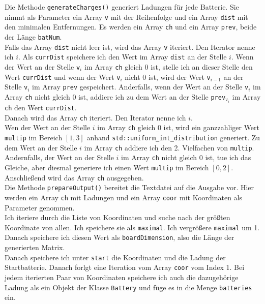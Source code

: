 \documentclass[a4paper,10pt,ngerman]{scrartcl}
\begin{document}
Die Methode \texttt{generateCharges()} generiert Ladungen für jede Batterie. Sie nimmt als Parameter ein
Array \texttt{v} mit der Reihenfolge und ein Array \texttt{dist} mit den minimalen Entfernungen.
Es werden ein Array \texttt{ch} und ein Array \texttt{prev}, beide der Länge \texttt{batNum}.\\
Falls das Array \texttt{dist} nicht leer ist, wird das Array \texttt{v} iteriert. Den Iterator nenne ich $i$.
Als \texttt{currDist} speichere ich den Wert im Array \texttt{dist} an der Stelle $i$.
Wenn der Wert an der Stelle \texttt{v}$_i$ im Array \texttt{ch} gleich 0 ist, stelle ich an dieser Stelle den Wert \texttt{currDist}
und wenn der Wert \texttt{v}$_i$ nicht 0 ist, wird der Wert \texttt{v}$_{i-1}$ an der Stelle \texttt{v}$_i$ im Array \texttt{prev}
gespeichert.
Anderfalls, wenn der Wert an der Stelle \texttt{v}$_i$ im Array \texttt{ch} nicht gleich 0 ist, addiere ich
zu dem Wert an der Stelle \texttt{prev}$_{\texttt{v}_i}$ im Array \texttt{ch} den Wert \texttt{currDist}.\\
Danach wird das Array \texttt{ch} iteriert. Den Iterator nenne ich $i$.\\
Wen der Wert an der Stelle $i$ im Array \texttt{ch} gleich 0 ist, wird ein ganzzahliger Wert \texttt{multip} im Bereich $[1,3]$ anhand 
\texttt{std::uniform\_int\_distribution} generiert. Zu dem Wert an der Stelle $i$ im Array \texttt{ch} addiere ich den 2. Vielfachen 
von \texttt{multip}.
Andernfalls, der Wert an der Stelle $i$ im Array \texttt{ch} nicht gleich 0 ist, tue ich das Gleiche, aber diesmal generiere
ich einen Wert \texttt{multip} im Bereich $[0,2]$.\\
Anschließend wird das Array \texttt{ch} ausgegeben.\\

Die Methode \texttt{prepareOutput()} bereitet die Textdatei auf die Ausgabe vor.
Hier werden ein Array \texttt{ch} mit Ladungen und ein Array \texttt{coor} mit Koordinaten als Parameter genommen.\\
Ich iteriere durch die Liste von Koordinaten und suche nach der größten Koordinate von allen. Ich speichere sie als
\texttt{maximal}. Ich vergrößere \texttt{maximal} um 1. Danach speichere ich diesen Wert als \texttt{boardDimension},
also die Länge der generierten Matrix.\\
Danach speichere ich unter \texttt{start} die Koordinaten und die Ladung der Startbatterie.
Danach forlgt eine Iteration vom Array \texttt{coor} vom Index 1. 
Bei jedem iterierten Paar von Koordinaten speichere ich auch die dazugehörige Ladung als ein Objekt der Klasse \texttt{Battery}
und füge es in die Menge \texttt{batteries} ein.\\
\end{document}
